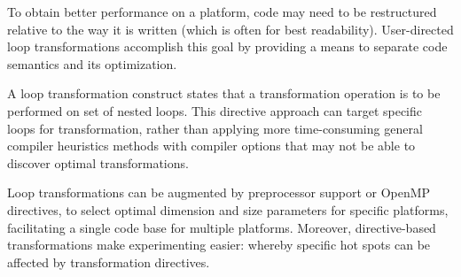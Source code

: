 \label{chap:loop_transformations}

To obtain better performance on a platform, code may need to be restructured 
relative to the way it is written (which is often for best readability).
User-directed loop transformations accomplish this goal by providing a means 
to separate code semantics and its optimization.

A loop transformation construct states that a transformation operation is to be 
performed on set of nested loops.  This directive approach can target specific loops
for transformation, rather than applying more time-consuming general compiler 
heuristics methods with compiler options that may not be able to discover 
optimal transformations.

Loop transformations can be augmented by preprocessor support or OpenMP  
directives, to select optimal dimension and size parameters for specific platforms,
facilitating a single code base for multiple platforms.
Moreover, directive-based transformations make experimenting easier: 
whereby specific hot spots can be affected by transformation directives.









